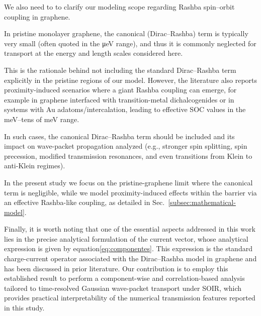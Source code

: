 We also need to to clarify our modeling scope regarding Rashba spin–orbit coupling in graphene.

In pristine monolayer graphene, the canonical (Dirac–Rashba) term is typically very small (often quoted in the μeV range), and thus it is commonly neglected for transport at the energy and length scales considered here.

This is the rationale behind not including the standard Dirac–Rashba term explicitly in the pristine regions of our model.
However, the literature also reports proximity-induced scenarios where a giant Rashba coupling can emerge, for example in graphene interfaced with transition-metal dichalcogenides or in systems with Au adatoms/intercalation, leading to effective SOC values in the meV–tens of meV range\cite{AvsarNatCommun2014, WangPhysRevX2016}.

In such cases, the canonical Dirac–Rashba term should be included and its impact on wave-packet propagation analyzed (e.g., stronger spin splitting, spin precession, modified transmission resonances, and even transitions from Klein to anti-Klein regimes).

In the present study we focus on the pristine-graphene limit where the canonical term is negligible, while we model proximity-induced effects within the barrier via an effective Rashba-like coupling, as detailed in Sec.~\ref{subsec:mathematical-model}.


Finally, it is worth noting that one of the essential aspects addressed in this work lies in the precise analytical formulation of the current vector, whose analytical expression is given by equation\eqref{eq:componentes}.
This expression is the standard charge-current operator associated with the Dirac–Rashba model in graphene and has been discussed in prior literature\cite{AvishaiPhysRevB2021}.
Our contribution is to employ this established result to perform a component-wise and correlation-based analysis tailored to time-resolved Gaussian wave-packet transport under SOIR, which provides practical interpretability of the numerical transmission features reported in this study.


%

